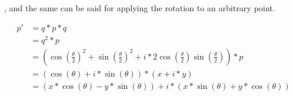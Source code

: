 , and the same can be said for applying the rotation to an arbitrary point.

\begin{equation}
\begin{split}
    p'  &= q*p*q \\
        &= q^2*p \\
        &= (\cos(\frac{\theta}{2})^2 + \sin(\frac{\theta}{2})^2 + i*2\cos(\frac{\theta}{2})\sin(\frac{\theta}{2}))*p \\
        &= (\cos(\theta) + i*\sin(\theta))*(x + i*y) \\
        &= (x*\cos(\theta) - y*\sin(\theta)) + i*(x*\sin(\theta) + y*\cos(\theta)) \\
\end{split}
\end{equation}